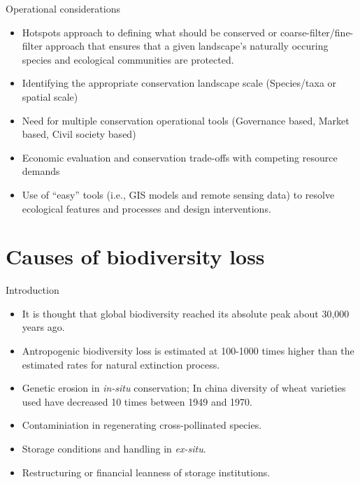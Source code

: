 \documentclass[
  ignorenonframetext,
  aspectratio=169]{beamer}
\providecommand{\tightlist}{%
  \setlength{\itemsep}{0pt}\setlength{\parskip}{0pt}}
\begin{document}
\begin{frame}{Operational considerations}
\protect\hypertarget{operational-considerations}{}
\begin{itemize}
\tightlist
\item
  Hotspots approach to defining what should be conserved or
  coarse-filter/fine-filter approach that ensures that a given
  landscape's naturally occuring species and ecological communities are
  protected.
\item
  Identifying the appropriate conservation landscape scale (Species/taxa
  or spatial scale)
\item
  Need for multiple conservation operational tools (Governance based,
  Market based, Civil society based)
\item
  Economic evaluation and conservation trade-offs with competing
  resource demands
\item
  Use of ``easy'' tools (i.e., GIS models and remote sensing data) to
  resolve ecological features and processes and design interventions.
\end{itemize}
\end{frame}

\hypertarget{causes-of-biodiversity-loss}{%
\section{Causes of biodiversity
loss}\label{causes-of-biodiversity-loss}}

\begin{frame}{Introduction}
\protect\hypertarget{introduction}{}
\begin{itemize}
\tightlist
\item
  It is thought that global biodiversity reached its absolute peak about
  30,000 years ago.
\item
  Antropogenic biodiversity loss is estimated at 100-1000 times higher
  than the estimated rates for natural extinction process.
\item
  Genetic erosion in \emph{in-situ} conservation; In china diversity of
  wheat varieties used have decreased 10 times between 1949 and 1970.
\item
  Contaminiation in regenerating cross-pollinated species.
\item
  Storage conditions and handling in \emph{ex-situ}.
\item
  Restructuring or financial leanness of storage institutions.
\end{itemize}
\end{frame}
\end{document}
